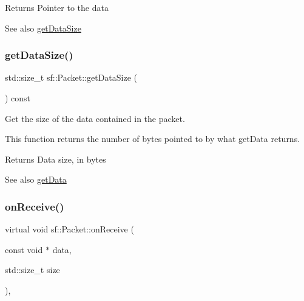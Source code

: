 \begin{DoxyReturn}{Returns}
Pointer to the data
\end{DoxyReturn}
\begin{DoxySeeAlso}{See also}
\hyperlink{classsf_1_1_packet_a0fae6eccf2ca704fc5099cd90a9f56f7}{get\+Data\+Size} 
\end{DoxySeeAlso}
\mbox{\label{classsf_1_1_packet_a0fae6eccf2ca704fc5099cd90a9f56f7}} 
\subsubsection{\texorpdfstring{get\+Data\+Size()}{getDataSize()}}
{\footnotesize\ttfamily std\+::size\+\_\+t sf\+::\+Packet\+::get\+Data\+Size (\begin{DoxyParamCaption}{ }\end{DoxyParamCaption}) const}



Get the size of the data contained in the packet. 

This function returns the number of bytes pointed to by what get\+Data returns.

\begin{DoxyReturn}{Returns}
Data size, in bytes
\end{DoxyReturn}
\begin{DoxySeeAlso}{See also}
\hyperlink{classsf_1_1_packet_abfd771803c822f89f187e1fcc2af5afc}{get\+Data} 
\end{DoxySeeAlso}
\mbox{\label{classsf_1_1_packet_ab71a31ef0f1d5d856de6f9fc75434128}} 
\subsubsection{\texorpdfstring{on\+Receive()}{onReceive()}}
{\footnotesize\ttfamily virtual void sf\+::\+Packet\+::on\+Receive (\begin{DoxyParamCaption}\item[{const void $\ast$}]{data,  }\item[{std\+::size\+\_\+t}]{size }\end{DoxyParamCaption})\hspace{0.3cm}{\ttfamily [protected]}, {\ttfamily [virtual]}}



